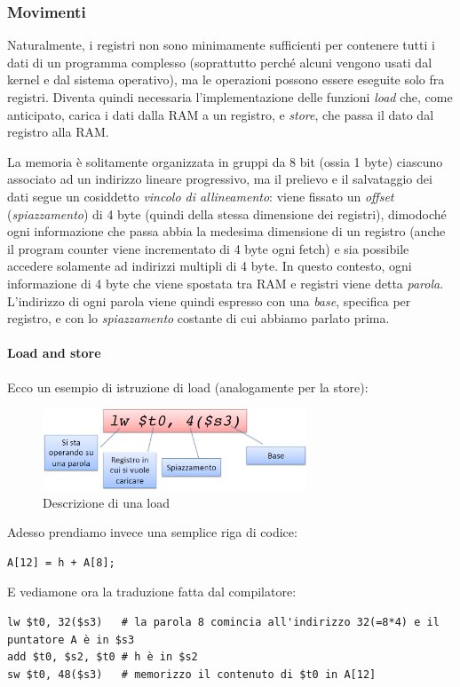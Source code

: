 \documentclass[class=book, crop=false, oneside]{standalone}
\begin{document}
\subsubsection{Movimenti}
Naturalmente, i registri non sono minimamente sufficienti per contenere tutti i dati di un programma complesso (soprattutto perché alcuni vengono usati dal kernel e dal sistema operativo), ma le operazioni possono essere eseguite solo fra registri. Diventa quindi necessaria l'implementazione delle funzioni \emph{load} che, come anticipato, carica i dati dalla RAM a un registro, e \emph{store}, che passa il dato dal registro alla RAM.

La memoria è solitamente organizzata in gruppi da 8 bit (ossia 1 byte) ciascuno associato ad  un indirizzo lineare progressivo, ma il prelievo e il salvataggio dei dati segue un cosiddetto \emph{vincolo di allineamento}: viene fissato un \emph{offset} (\emph{spiazzamento}) di 4 byte (quindi della stessa dimensione dei registri), dimodoché ogni informazione che passa abbia la medesima dimensione di un registro (anche il program counter viene incrementato di 4 byte ogni fetch) e sia possibile accedere solamente ad indirizzi multipli di 4 byte. In questo contesto, ogni informazione di 4 byte che viene spostata tra RAM e registri viene detta \emph{parola}.\\
L'indirizzo di ogni parola viene quindi espresso con una \emph{base}, specifica per registro, e con lo \emph{spiazzamento} costante di cui abbiamo parlato prima.

\paragraph{Load and store}
Ecco un esempio di istruzione di load (analogamente per la store):
\begin{figure}[H]
	\centering
	\includegraphics[width=0.7\textwidth,keepaspectratio]{load}
	\caption{Descrizione di una load}
\end{figure}
Adesso prendiamo invece una semplice riga di codice:
\begin{verbatim}
A[12] = h + A[8];
\end{verbatim}
E vediamone ora la traduzione fatta dal compilatore:
\begin{verbatim}
lw $t0, 32($s3)   # la parola 8 comincia all'indirizzo 32(=8*4) e il puntatore A è in $s3
add $t0, $s2, $t0 # h è in $s2
sw $t0, 48($s3)   # memorizzo il contenuto di $t0 in A[12]
\end{verbatim}
\end{document}
